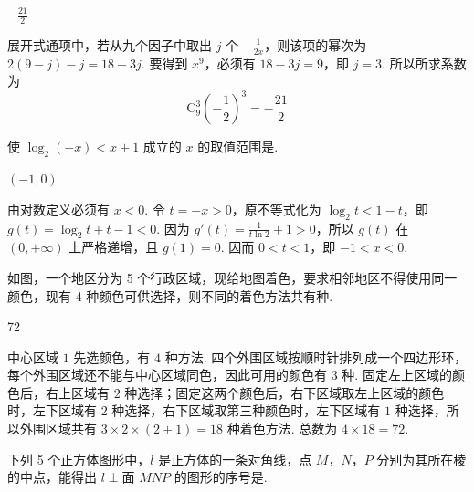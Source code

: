 \begin{answer}
\(-\frac{21}{2}\)
\end{answer}

\begin{solution}
展开式通项中，若从九个因子中取出 \(j\) 个 \(-\frac1{2x}\)，则该项的幂次为 \(2(9-j)-j=18-3j\). 要得到 \(x^9\)，必须有 \(18-3j=9\)，即 \(j=3\). 所以所求系数为
\[
\mathrm C_9^3\left(-\frac12\right)^3=-\frac{21}{2}
\]
\end{solution}

\begin{problem}
使 \(\log_2(-x) < x + 1\) 成立的 \(x\) 的取值范围是\fillinblank{}.
\end{problem}

\begin{answer}
\((-1,0)\)
\end{answer}

\begin{solution}
由对数定义必须有 \(x<0\). 令 \(t=-x>0\)，原不等式化为 \(\log_2t<1-t\)，即 \(g(t)=\log_2t+t-1<0\). 因为 \(g'(t)=\frac1{t\ln2}+1>0\)，所以 \(g(t)\) 在 \((0,+\infty)\) 上严格递增，且 \(g(1)=0\). 因而 \(0<t<1\)，即 \(-1<x<0\).
\end{solution}

\begin{problem}
如图，一个地区分为 5 个行政区域，现给地图着色，要求相邻地区不得使用同一颜色，现有 4 种颜色可供选择，则不同的着色方法共有\fillinblank{}种.

\FloatBarrier
\end{problem}

\begin{answer}
72
\end{answer}

\begin{solution}
中心区域 \(1\) 先选颜色，有 \(4\) 种方法. 四个外围区域按顺时针排列成一个四边形环，每个外围区域还不能与中心区域同色，因此可用的颜色有 \(3\) 种. 固定左上区域的颜色后，右上区域有 \(2\) 种选择；固定这两个颜色后，右下区域取左上区域的颜色时，左下区域有 \(2\) 种选择，右下区域取第三种颜色时，左下区域有 \(1\) 种选择，所以外围区域共有 \(3\times2\times(2+1)=18\) 种着色方法. 总数为 \(4\times18=72\).
\end{solution}

\begin{problem}
下列 5 个正方体图形中，\(l\) 是正方体的一条对角线，点 \(M\)，\(N\)，\(P\) 分别为其所在棱的中点，能得出 \(l \perp \text{面 } MNP\) 的图形的序号是\fillinblank{}.

\FloatBarrier
\end{problem}

